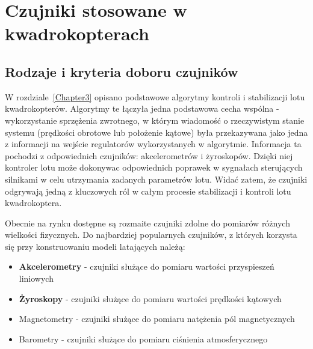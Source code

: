 
\chapter{Czujniki stosowane w kwadrokopterach} %

\label{Chapter4} %


\section{Rodzaje i kryteria doboru czujników}

W rozdziale~\ref{Chapter3} opisano podstawowe algorytmy kontroli i stabilizacji lotu kwadrokopterów. Algorytmy te łączyła jedna podstawowa cecha wspólna - wykorzystanie sprzężenia zwrotnego, w którym wiadomość o rzeczywistym stanie systemu (prędkości obrotowe lub położenie kątowe) była przekazywana jako jedna z informacji na wejście regulatorów wykorzystanych w algorytmie. Informacja ta pochodzi z odpowiednich czujników: akcelerometrów i żyroskopów. Dzięki niej kontroler lotu może dokonywac odpowiednich poprawek w sygnałach sterujących silnikami w celu utrzymania zadanych parametrów lotu. Widać zatem, że czujniki odgrywają jedną z kluczowych ról w całym procesie stabilizacji i kontroli lotu kwadrokoptera. 

Obecnie na rynku dostępne są rozmaite czujniki zdolne do pomiarów różnych wielkości fizycznych. Do najbardziej popularnych czujników, z których korzysta się przy konstruowaniu modeli latających należą:

\begin{itemize}
	\item \textbf{Akcelerometry} - czujniki służące do pomiaru wartości przyspieszeń liniowych
	\item \textbf{Żyroskopy} - czujniki służące do pomiaru wartości prędkości kątowych
	\item Magnetometry - czujniki służące do pomiaru natężenia pól magnetycznych
	\item Barometry - czujniki służące do pomiaru ciśnienia atmosferycznego
\end{itemize}

